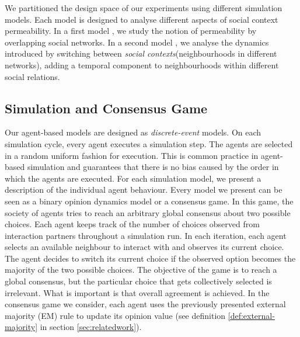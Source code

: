 \documentclass[preprint,number]{elsarticle}
\begin{document}
	We partitioned the design space of our experiments using different simulation models. Each model is designed to analyse different aspects of social context permeability. In a first model \cite{Antunes2007, Antunes2010}, we study the notion of permeability by overlapping social networks. In a second model \cite{Antunes2009}, we analyse the dynamics introduced by switching between \textit{social contexts}(neighbourhoods in different networks), adding a temporal component to neighbourhoods within different social relations. 
	
	\subsection{Simulation and Consensus Game}
	\label{sec:sim_consensus}
	Our agent-based models are designed as \textit{discrete-event} models. On each simulation cycle, every agent executes a simulation step. The agents are selected in a random uniform fashion for execution. This is common practice in agent-based simulation and guarantees that there is no bias caused by the order in which the agents are executed. For each simulation model, we present a description of the individual agent behaviour. Every model we present can be seen as a binary opinion dynamics model or a consensus game. In this game, the society of agents tries to reach an arbitrary global consensus about two possible choices. Each agent keeps track of the number of choices observed from interaction partners throughout a simulation run. In each iteration, each agent selects an available neighbour to interact with and observes its current choice. The agent decides to switch its current choice if the observed option becomes the majority of the two possible choices. The objective of the game is to reach a global consensus, but the particular choice that gets collectively selected is irrelevant. What is important is that overall agreement is achieved. In the consensus game we consider, each agent uses the previously presented external majority (EM) rule to update its opinion value (see definition \ref{def:external-majority} in section \ref{sec:relatedwork}).
	
	
	
	\newpage
\end{document}
